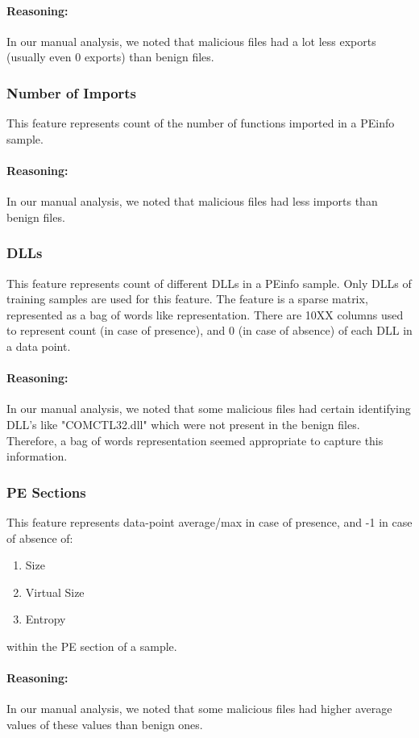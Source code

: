 \documentclass{llncs}
\begin{document}
\paragraph{Reasoning:}
In our manual analysis, we noted that malicious files had a lot less exports (usually even 0 exports) than benign files.

\subsubsection{Number of Imports}
This feature represents count of the number of functions imported in a PEinfo sample. 
\paragraph{Reasoning:}
In our manual analysis, we noted that malicious files had less imports than benign files.

\subsubsection{DLLs}
This feature represents count of different DLLs in a PEinfo sample. Only DLLs of training samples are used for this feature. The feature is a sparse matrix, represented as a bag of words like representation. 
There are 10XX columns used to represent count (in case of presence), and 0 (in case of absence) of each DLL in a data point.
\paragraph{Reasoning:}
In our manual analysis, we noted that some malicious files had certain identifying DLL's like "COMCTL32.dll" which were not present in the benign files. Therefore, a bag of words representation seemed appropriate to capture this information.

\subsubsection{PE Sections}
This feature represents data-point average/max in case of presence, and -1 in case of absence of:
\begin{enumerate}
	\item Size
	\item Virtual Size
	\item Entropy
\end {enumerate}
within the PE section of a sample.
\paragraph{Reasoning:}
In our manual analysis, we noted that some malicious files had higher average values of these values than benign ones.
\end{document}
